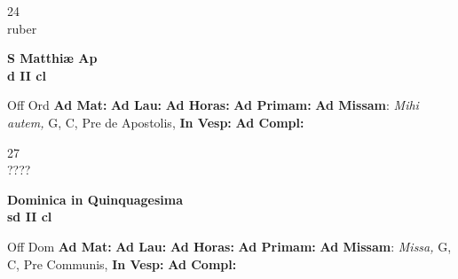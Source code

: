 \documentclass[10pt, openany]{book}
\begin{document}
    \begin{center}
        \begin{minipage}{3.5in}
            \vspace{2em}
            \begin{minipage}{0.5in}
                {\Huge 24} \\
                {\normalsize ruber}
            \end{minipage}
            \begin{minipage}{3.0in}
                \textbf{ \large S Matthiæ Ap \\
                \textnormal{\normalsize d II cl}}

            \end{minipage}
            \begin{justify}Off Ord
                \textbf{Ad Mat: }
                \textbf{Ad Lau: }
                \textbf{Ad Horas: }
                \textbf{Ad Primam: }\textbf{Ad Missam}: \textit{Mihi autem,} G, C, Pre de Apostolis, 
                \textbf{In Vesp: }
                \textbf{Ad Compl: }
            \end{justify}
        \end{minipage}
    \end{center}

    \begin{center}
        \begin{minipage}{3.5in}
            \vspace{2em}
            \begin{minipage}{0.5in}
                {\Huge 27} \\
                {\normalsize ????}
            \end{minipage}
            \begin{minipage}{3.0in}
                \textbf{ \large Dominica in Quinquagesima \\
                \textnormal{\normalsize sd II cl}}

            \end{minipage}
            \begin{justify}Off Dom
                \textbf{Ad Mat: }
                \textbf{Ad Lau: }
                \textbf{Ad Horas: }
                \textbf{Ad Primam: }\textbf{Ad Missam}: \textit{Missa,} G, C, Pre Communis, 
                \textbf{In Vesp: }
                \textbf{Ad Compl: }
            \end{justify}
        \end{minipage}
    \end{center}
\end{document}

